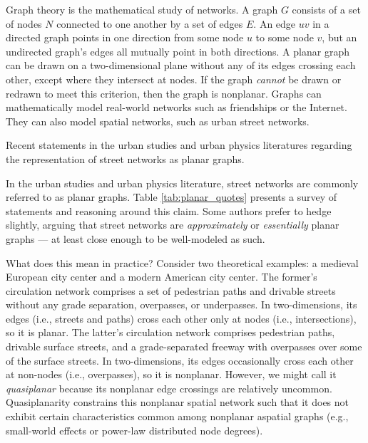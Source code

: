 \documentclass[Afour,sageh,times]{sagej}
\begin{document}
Graph theory is the mathematical study of networks. A graph $G$ consists of a set of nodes $N$ connected to one another by a set of edges $E$. An edge $uv$ in a directed graph points in one direction from some node $u$ to some node $v$, but an undirected graph's edges all mutually point in both directions. A planar graph can be drawn on a two-dimensional plane without any of its edges crossing each other, except where they intersect at nodes. If the graph \emph{cannot} be drawn or redrawn to meet this criterion, then the graph is nonplanar. Graphs can mathematically model real-world networks such as friendships or the Internet. They can also model spatial networks, such as urban street networks.

\begin{table}[htbp]
\centering
\caption{Recent statements in the urban studies and urban physics literatures regarding the representation of street networks as planar graphs.}
\label{tab:planar_quotes}

\end{table}

In the urban studies and urban physics literature, street networks are commonly referred to as planar graphs. Table \ref{tab:planar_quotes} presents a survey of statements and reasoning around this claim. Some authors prefer to hedge slightly, arguing that street networks are \emph{approximately} or \emph{essentially} planar graphs --- at least close enough to be well-modeled as such.

What does this mean in practice? Consider two theoretical examples: a medieval European city center and a modern American city center. The former's circulation network comprises a set of pedestrian paths and drivable streets without any grade separation, overpasses, or underpasses. In two-dimensions, its edges (i.e., streets and paths) cross each other only at nodes (i.e., intersections), so it is planar. The latter's circulation network comprises pedestrian paths, drivable surface streets, and a grade-separated freeway with overpasses over some of the surface streets. In two-dimensions, its edges occasionally cross each other at non-nodes (i.e., overpasses), so it is nonplanar. However, we might call it \emph{quasiplanar} because its nonplanar edge crossings are relatively uncommon. Quasiplanarity constrains this nonplanar spatial network such that it does not exhibit certain characteristics common among nonplanar aspatial graphs (e.g., small-world effects or power-law distributed node degrees).
\end{document}
